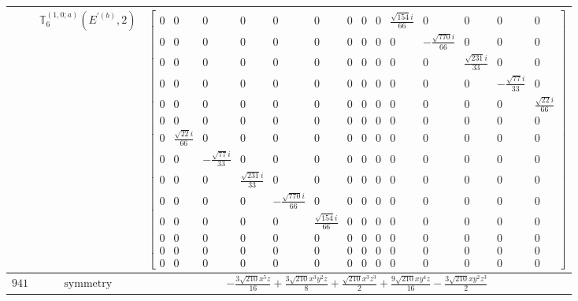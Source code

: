 \documentclass[fleqn,8pt,landscape]{jsarticle}
\begin{document}
\begin{longtable}{ccc}
$  $ & $ \mathbb{T}_{6}^{(1,0;a)}(E^{\prime(b)},2) $ & $ \begin{bmatrix} 0 & 0 & 0 & 0 & 0 & 0 & 0 & 0 & 0 & \frac{\sqrt{154} i}{66} & 0 & 0 & 0 & 0 \\ 0 & 0 & 0 & 0 & 0 & 0 & 0 & 0 & 0 & 0 & - \frac{\sqrt{770} i}{66} & 0 & 0 & 0 \\ 0 & 0 & 0 & 0 & 0 & 0 & 0 & 0 & 0 & 0 & 0 & \frac{\sqrt{231} i}{33} & 0 & 0 \\ 0 & 0 & 0 & 0 & 0 & 0 & 0 & 0 & 0 & 0 & 0 & 0 & - \frac{\sqrt{77} i}{33} & 0 \\ 0 & 0 & 0 & 0 & 0 & 0 & 0 & 0 & 0 & 0 & 0 & 0 & 0 & \frac{\sqrt{22} i}{66} \\ 0 & 0 & 0 & 0 & 0 & 0 & 0 & 0 & 0 & 0 & 0 & 0 & 0 & 0 \\ 0 & \frac{\sqrt{22} i}{66} & 0 & 0 & 0 & 0 & 0 & 0 & 0 & 0 & 0 & 0 & 0 & 0 \\ 0 & 0 & - \frac{\sqrt{77} i}{33} & 0 & 0 & 0 & 0 & 0 & 0 & 0 & 0 & 0 & 0 & 0 \\ 0 & 0 & 0 & \frac{\sqrt{231} i}{33} & 0 & 0 & 0 & 0 & 0 & 0 & 0 & 0 & 0 & 0 \\ 0 & 0 & 0 & 0 & - \frac{\sqrt{770} i}{66} & 0 & 0 & 0 & 0 & 0 & 0 & 0 & 0 & 0 \\ 0 & 0 & 0 & 0 & 0 & \frac{\sqrt{154} i}{66} & 0 & 0 & 0 & 0 & 0 & 0 & 0 & 0 \\ 0 & 0 & 0 & 0 & 0 & 0 & 0 & 0 & 0 & 0 & 0 & 0 & 0 & 0 \\ 0 & 0 & 0 & 0 & 0 & 0 & 0 & 0 & 0 & 0 & 0 & 0 & 0 & 0 \\ 0 & 0 & 0 & 0 & 0 & 0 & 0 & 0 & 0 & 0 & 0 & 0 & 0 & 0 \end{bmatrix} $ \\ \hline
$ 941 $ & $ \text{symmetry} $ & $ - \frac{3 \sqrt{210} x^{5} z}{16} + \frac{3 \sqrt{210} x^{3} y^{2} z}{8} + \frac{\sqrt{210} x^{3} z^{3}}{2} + \frac{9 \sqrt{210} x y^{4} z}{16} - \frac{3 \sqrt{210} x y^{2} z^{3}}{2} $ \\

\end{longtable}
\end{document}
